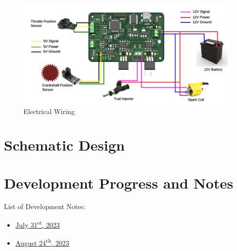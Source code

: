 \documentclass[a4paper,12pt,oneside,pdflatex,italian,final,twocolumn]{article}
\begin{document}
	\begin{figure}[h]
		\centering
		\includegraphics[width=\textwidth]{images/wiring_lqfp64.png}
		\caption{Electrical Wiring}
	\end{figure}

	\section{Schematic Design}
	
	

	\newpage
	\section{Development Progress and Notes}
	
	List of Development Notes:
	\begin{itemize}
		\item \href{https://github.com/deninur2427/ecu_pnm/blob/main/docs/notes/tes_31072023.md}{July 31\textsuperscript{st}, 2023}
		
		\item \href{https://github.com/deninur2427/ecu_pnm/blob/main/docs/notes/tes_24082023.md}{August 24\textsuperscript{th}, 2023}
	\end{itemize}
	
\end{document}

